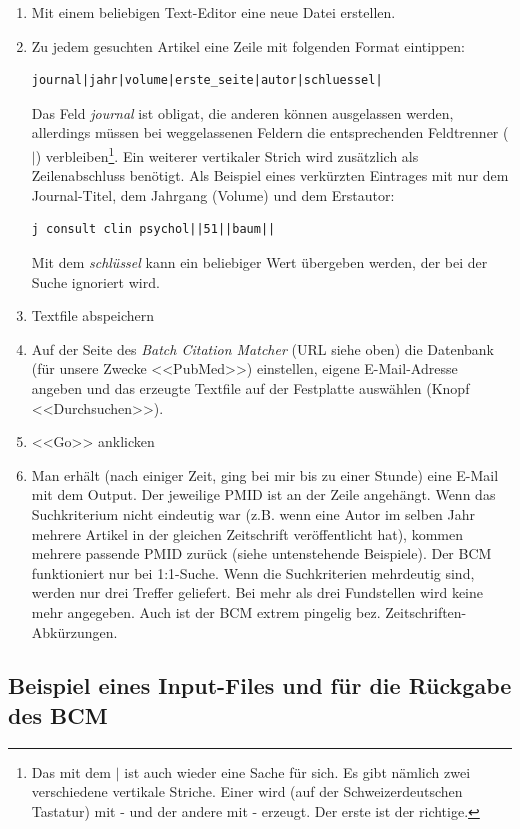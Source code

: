 \documentclass[div=15,parskip=half]{scrartcl}
\begin{document}
\begin{enumerate}
	\item Mit einem beliebigen Text-Editor eine neue Datei erstellen.
	\item Zu jedem gesuchten Artikel eine Zeile mit folgenden Format eintippen:
	\begin{verbatim}journal|jahr|volume|erste_seite|autor|schluessel| \end{verbatim}
	Das Feld \textsl{journal} ist obligat, die anderen können ausgelassen werden, allerdings müssen bei weggelassenen Feldern die entsprechenden Feldtrenner ($\vert$) verbleiben\footnote{Das mit dem $\vert$ ist auch wieder eine Sache für sich. Es gibt nämlich zwei verschiedene vertikale Striche. Einer wird (auf der Schweizerdeutschen Tastatur) mit \AltGr- und der andere mit \AltGr- erzeugt. Der erste ist der richtige.}. Ein weiterer vertikaler Strich wird zusätzlich als Zeilenabschluss benötigt. Als Beispiel eines verkürzten Eintrages mit nur dem Journal-Titel, dem Jahrgang (Volume) und dem Erstautor:
	\begin{verbatim}j consult clin psychol||51||baum|| \end{verbatim}
	Mit dem \textsl{schlüssel} kann ein beliebiger Wert übergeben werden, der bei der Suche ignoriert wird.
	\item Textfile abspeichern
	\item Auf der Seite des \textsl{Batch Citation Matcher} (URL siehe oben) die Datenbank (für unsere Zwecke <<PubMed>>) einstellen, eigene E-Mail-Adresse angeben und das erzeugte Textfile auf der Festplatte auswählen (Knopf <<Durchsuchen>>).
	\item <<Go>> anklicken
	\item Man erhält (nach einiger Zeit, ging bei mir bis zu einer Stunde) eine E-Mail mit dem Output. Der jeweilige PMID ist an der Zeile angehängt. Wenn das Suchkriterium nicht eindeutig war (z.B. wenn eine Autor im selben Jahr mehrere Artikel in der gleichen Zeitschrift veröffentlicht hat), kommen mehrere passende PMID zurück (siehe untenstehende Beispiele).  Der BCM funktioniert nur bei 1:1-Suche. Wenn die Suchkriterien mehrdeutig sind, werden nur drei Treffer geliefert. Bei mehr als drei Fundstellen wird keine mehr angegeben. Auch ist der BCM extrem pingelig bez. Zeitschriften-Abkürzungen.
\end{enumerate}

\subsection*{Beispiel eines Input-Files und für die Rückgabe des BCM}
\end{document}
